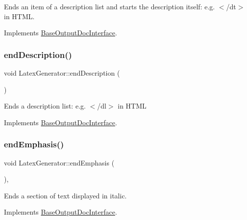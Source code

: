 Ends an item of a description list and starts the description itself\+: e.\+g. {\ttfamily $<$/dt$>$} in H\+T\+ML. 

Implements \mbox{\hyperlink{class_base_output_doc_interface_a09e3aa9d3faac55b2cc9290eaa69f55b}{Base\+Output\+Doc\+Interface}}.

\mbox{\label{class_latex_generator_a3da64ef2d6cfe58facd7a35ad736ea83}} 
\subsubsection{\texorpdfstring{endDescription()}{endDescription()}}
{\footnotesize\ttfamily void Latex\+Generator\+::end\+Description (\begin{DoxyParamCaption}{ }\end{DoxyParamCaption})\hspace{0.3cm}{\ttfamily [virtual]}}

Ends a description list\+: e.\+g. {\ttfamily $<$/dl$>$} in H\+T\+ML 

Implements \mbox{\hyperlink{class_base_output_doc_interface_ac25c565e9fd8aee6c2b0d9b71fcff380}{Base\+Output\+Doc\+Interface}}.

\mbox{\label{class_latex_generator_a5837f5169fd6b05b088a4d9182756711}} 
\subsubsection{\texorpdfstring{endEmphasis()}{endEmphasis()}}
{\footnotesize\ttfamily void Latex\+Generator\+::end\+Emphasis (\begin{DoxyParamCaption}{ }\end{DoxyParamCaption})\hspace{0.3cm}{\ttfamily [inline]}, {\ttfamily [virtual]}}

Ends a section of text displayed in italic. 

Implements \mbox{\hyperlink{class_base_output_doc_interface_aed2cf04d82648509f97403bd4ce62590}{Base\+Output\+Doc\+Interface}}.

\mbox{\label{class_latex_generator_a553927a6db74aca325fa50bd666b44b0}} 
